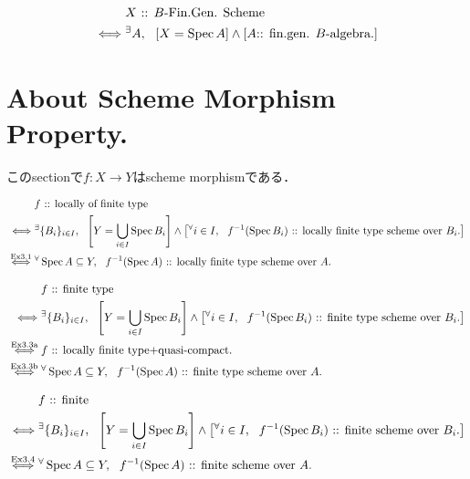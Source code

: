 \documentclass[a4paper]{jsarticle}
\begin{document}
\begin{Def}
\begin{align*}
    {}&     X\text{ :: $B$-Fin.Gen. Scheme} \\
    \iff&  
            {}^{\exists} A,~~
            \left[X=\operatorname{Spec} A\right] \land \left[A\text{:: fin.gen. $B$-algebra.}\right]
\end{align*}
\end{Def}

\section{About Scheme Morphism Property.}
このsectionで$f: X \to Y$はscheme morphismである．

\begin{Def}
\begin{align*}
    {}&     f\text{ :: locally of finite type} \\
    \iff&
            {}^{\exists} \{B_i\}_{i \in I},~~
            \left[Y=\bigcup_{i \in I} \operatorname{Spec} B_i\right] \land \left[{}^{\forall} i \in I,~~ f^{-1}(\operatorname{Spec} B_i)\text{ :: locally finite type scheme over $B_i$.}\right] \\
    \overset{\text{ Ex3.1 }}{\iff}&
            {}^{\forall} \operatorname{Spec} A \subseteq Y,~~ f^{-1}(\operatorname{Spec} A)\text{ :: locally finite type scheme over $A$.}
\end{align*}
\end{Def}

\begin{Def}
\begin{align*}
    {}&     f\text{ :: finite type} \\
    \iff&
            {}^{\exists} \{B_i\}_{i \in I},~~
            \left[Y=\bigcup_{i \in I} \operatorname{Spec} B_i\right] \land \left[{}^{\forall} i \in I,~~ f^{-1}(\operatorname{Spec} B_i)\text{ :: finite type scheme over $B_i$.}\right] \\
    \overset{\text{ Ex3.3a }}{\iff}&
            f\text{ :: locally finite type+quasi-compact.} \\
    \overset{\text{ Ex3.3b }}{\iff}&
            {}^{\forall} \operatorname{Spec} A \subseteq Y,~~ f^{-1}(\operatorname{Spec} A)\text{ :: finite type scheme over $A$.}
\end{align*}
\end{Def}

\begin{Def}[Finite]
\begin{align*}
    {}&     f\text{ :: finite} \\
    \iff&
            {}^{\exists} \{B_i\}_{i \in I},~~
            \left[Y=\bigcup_{i \in I} \operatorname{Spec} B_i\right] \land \left[{}^{\forall} i \in I,~~ f^{-1}(\operatorname{Spec} B_i)\text{ :: finite scheme over $B_i$.}\right] \\
    \overset{\text{ Ex3.4 }}{\iff}&
            {}^{\forall} \operatorname{Spec} A \subseteq Y,~~ f^{-1}(\operatorname{Spec} A)\text{ :: finite scheme over $A$.} \\
\end{align*}
\end{Def}
\end{document}

